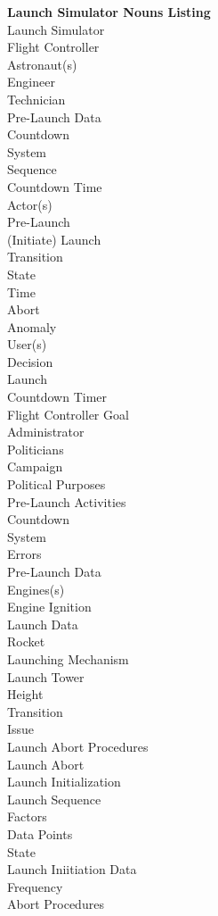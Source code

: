 \documentclass[letterpaper]{article}
\begin{document}
\noindent
\textbf{Launch Simulator Nouns Listing}\\
Launch Simulator\\
Flight Controller\\
Astronaut(s)\\
Engineer\\
Technician\\
Pre-Launch Data\\
Countdown\\
System\\
Sequence\\
Countdown Time\\
Actor(s)\\
Pre-Launch\\
(Initiate) Launch\\
Transition\\
State\\
Time\\
Abort\\
Anomaly\\
User(s)\\
Decision\\
Launch\\
Countdown Timer\\
Flight Controller Goal\\
Administrator\\
Politicians\\
Campaign\\
Political Purposes\\
Pre-Launch Activities\\
Countdown\\
System\\
Errors\\
Pre-Launch Data\\
Engines(s)\\
Engine Ignition\\
Launch Data\\
Rocket\\
Launching Mechanism\\
Launch Tower\\
Height\\
Transition\\
Issue\\
Launch Abort Procedures\\
Launch Abort\\
Launch Initialization\\
Launch Sequence\\
Factors\\
Data Points\\
State\\
Launch Iniitiation Data\\
Frequency\\
Abort Procedures\\
\end{document}
